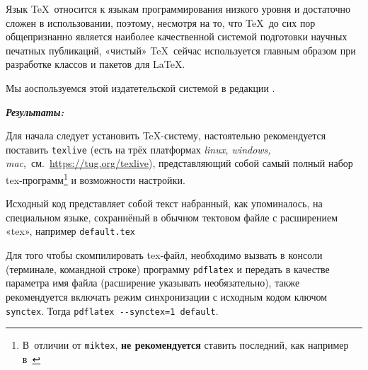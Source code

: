 Язык \TeX\ относится к языкам программирования низкого уровня и достаточно сложен в использовании, поэтому, несмотря на то, что \TeX\ до сих пор общепризнанно является наиболее качественной системой подготовки научных печатных публикаций, «чистый» \TeX\ сейчас используется главным образом при разработке классов и пакетов для \LaTeX.

Мы аоспользуемся этой издатетельской системой в редакции \LaTeXe.


{\bfseries\itshape Результаты:}
\label{sec:results}

Для начала следует установить \TeX-систему, настоятельно рекомендуется поставить \texttt{texlive} (есть на трёх платформах \textit{linux, windows, mac},~см.~\url{https://tug.org/texlive}), представляющий собой самый полный набор tex\nobreak-программ\footnote{В отличии от \texttt{miktex}, \textbf{не рекомендуется} ставить последний, как например в~\cite{nasyrov:book:2019:01}} и возможности настройки.

Исходный код представляет собой текст набранный, как упоминалось, на специальном языке, сохраннёный в обычном тектовом файле с расширением «tex», например \texttt{default.tex}

Для того чтобы скомпилировать tex\nobreak-файл, необходимо вызвать в консоли (терминале, командной строке) программу \texttt{pdflatex} и передать в качестве параметра имя файла (расширение указывать необязательно), также рекомендуется включать режим синхронизации с исходным кодом ключом \texttt{synctex}. Тогда \verb|pdflatex --synctex=1 default|.

